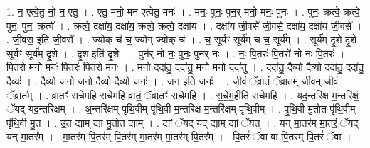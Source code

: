 \documentclass[17pt]{extarticle}
\begin{document}
1. न॒ ए॒त्वे॒तु॒ नो॒ न॒ ए॒तु॒ । . ए॒तु॒ मनो॒ मन॑ एत्वेतु॒ मनः॑ । . मनः॒ पुनः॒ पुन॒र् मनो॒ मनः॒ पुनः॑ । . पुनः॒ क्रत्वे॒ क्रत्वे॒ पुनः॒ पुनः॒ क्रत्वे᳚ । . क्रत्वे॒ दक्षा॑य॒ दक्षा॑य॒ क्रत्वे॒ क्रत्वे॒ दक्षा॑य । . दक्षा॑य जी॒वसे॑ जी॒वसे॒ दक्षा॑य॒ दक्षा॑य जी॒वसे᳚ । . जी॒वस॒ इति॑ जी॒वसे᳚ । . ज्योक् च॑ च॒ ज्योग् ज्योक् च॑ । . च॒ सूर्यꣳ॒॒ सूर्य॑म् च च॒ सूर्य᳚म् । . सूर्य॑म् दृ॒शे दृ॒शे सूर्यꣳ॒॒ सूर्य॑म् दृ॒शे । . दृ॒श इति॑ दृ॒शे । . पुन॑र् नो नः॒ पुनः॒ पुन॑र् नः । . नः॒ पि॒तरः॑ पि॒तरो॑ नो नः पि॒तरः॑ । . पि॒तरो॒ मनो॒ मनः॑ पि॒तरः॑ पि॒तरो॒ मनः॑ । . मनो॒ ददा॑तु॒ ददा॑तु॒ मनो॒ मनो॒ ददा॑तु । . ददा॑तु॒ दैव्यो॒ दैव्यो॒ ददा॑तु॒ ददा॑तु॒ दैव्यः॑ । . दैव्यो॒ जनो॒ जनो॒ दैव्यो॒ दैव्यो॒ जनः॑ । . जन॒ इति॒ जनः॑ । . जी॒वं ॅव्रातं॒ ॅव्रात॑म् जी॒वम् जी॒वं ॅव्रात᳚म् । . व्रातꣳ॑ सचेमहि सचेमहि॒ व्रातं॒ ॅव्रातꣳ॑ सचेमहि । . स॒चे॒म॒हीति॑ सचेमहि । . यद॒न्तरि॑क्ष म॒न्तरि॑क्षं॒ ॅयद् यद॒न्तरि॑क्षम् । . अ॒न्तरि॑क्षम् पृथि॒वीम् पृ॑थि॒वी म॒न्तरि॑क्ष म॒न्तरि॑क्षम् पृथि॒वीम् । . पृ॒थि॒वी मु॒तोत पृ॑थि॒वीम् पृ॑थि॒वी मु॒त । . उ॒त द्याम् द्या मु॒तोत द्याम् । . द्यां ॅयद् यद् द्याम् द्यां ॅयत् । . यन् मा॒तर॑म् मा॒तरं॒ ॅयद् यन् मा॒तर᳚म् । . मा॒तर॑म् पि॒तर॑म् पि॒तर॑म् मा॒तर॑म् मा॒तर॑म् पि॒तर᳚म् । . पि॒तरं॑ ॅवा वा पि॒तर॑म् पि॒तरं॑ ॅवा । \newline
\end{document}
